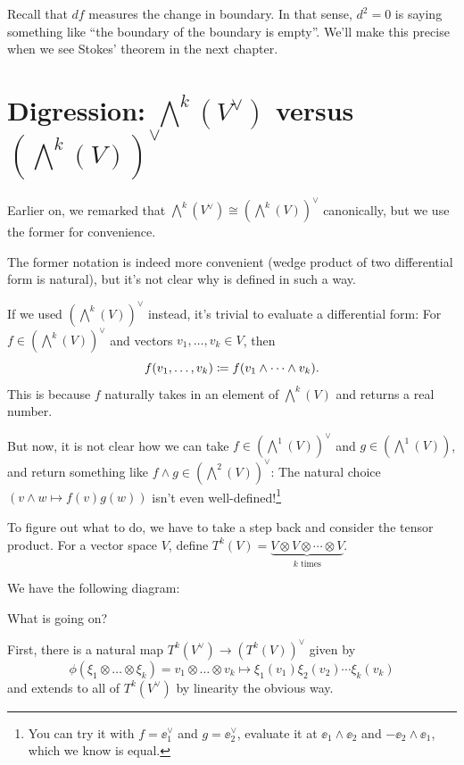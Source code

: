 Recall that $df$ measures the change in boundary.
In that sense, $d^2 = 0$ is saying something like
``the boundary of the boundary is empty''.
We'll make this precise when we see Stokes' theorem in the next chapter.

\section{Digression: $\bigwedge^k(V^\vee)$ versus $(\bigwedge^k(V))^\vee$}
\label{sec:wedge_product_dual}

Earlier on, we remarked that $\bigwedge^k(V^\vee) \cong (\bigwedge^k(V))^\vee$ canonically, but we
use the former for convenience.

The former notation is indeed more convenient (wedge product of
two differential form is natural), but it's not clear why  is
defined in such a way.

If we used $(\bigwedge^k(V))^\vee$ instead, it's trivial to evaluate a differential form:
For $f \in (\bigwedge^k(V))^\vee$ and vectors $v_1, \dots, v_k \in V$, then
\[
	f(v_1, \dots, v_k) \coloneqq f(v_1 \wedge \dots \wedge v_k).
\]
This is because $f$ naturally takes in an element of $\bigwedge^k(V)$ and returns a real number.

But now, it is not clear how we can take $f \in (\bigwedge^1(V))^\vee$ and $g \in (\bigwedge^1(V))$, and
return something like $f \wedge g \in (\bigwedge^2(V))^\vee$: The natural choice $(v \wedge w
\mapsto f(v) g(w))$ isn't even well-defined!\footnote{You can try it with $f = \ee_1^\vee$ and
$g = \ee_2^\vee$, evaluate it at $\ee_1 \wedge \ee_2$ and $-\ee_2 \wedge \ee_1$,
which we know is equal.}

To figure out what to do, we have to take a step back and consider the tensor product.
For a vector space $V$,
define $T^k(V) = \underbrace{V \otimes V \otimes \cdots \otimes V}_{\text{$k$ times}}$.

We have the following diagram:
\begin{center}
\end{center}

What is going on?

First, there is a natural map $T^k(V^\vee) \to (T^k(V))^\vee$ given by
\[ \phi(\xi_1 \otimes \dots \otimes \xi_k) = v_1 \otimes \dots \otimes v_k \mapsto
\xi_1(v_1) \xi_2(v_2) \dotsm \xi_k(v_k) \]
and extends to all of $T^k(V^\vee)$ by linearity the obvious way.

